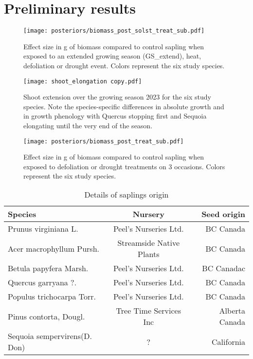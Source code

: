 \documentclass{article}
\begin{document}
	
	\section*{Preliminary results}
	
	
	\begin{figure}
	\centering
	\texttt{[image: posteriors/biomass\_post\_solst\_treat\_sub.pdf]} 
	\caption{Effect size in g of biomass compared to control sapling when exposed to an extended growing season (GS\_extend), heat, defoliation or drought event. Colors represent the six study species. }
	\label{fig:fig_1xxx}
\end{figure}
	
	
			\begin{figure}
		\centering
		\texttt{[image: shoot\_elongation copy.pdf]} 
		\caption{Shoot extension over the growing season 2023 for the six study species. Note the species-specific differences in absolute growth and in growth phenology with Quercus stopping first and Sequoia elongating until the very end of the season.}
		\label{fig:fig_1xxx}
	\end{figure}
	
	
				\begin{figure}
		\centering
		\texttt{[image: posteriors/biomass\_post\_treat\_sub.pdf]} 
		\caption{Effect size in g of biomass compared to control sapling when exposed to defoliation or drought treatments on 3 occasions. Colors represent the six study species.}
		\label{fig:fig_1xxx}
	\end{figure}
	
	
	
	
	\begin{table}[h!]
		\begin{center}
			\caption{Details of saplings origin }
			\label{tab:table1}
			\begin{tabular}{l|c|r} %
				\textbf{Species} & \textbf{Nursery} & \textbf{Seed origin}\\
				\hline
				Prunus virginiana L. & Peel's Nurseries Ltd. & BC Canada\\
				Acer macrophyllum Pursh. & Streamside Native Plants & BC Canada\\
				Betula papyfera Marsh. & Peel's Nurseries Ltd. &BC Canadac\\
				Quercus garryana ?.& Peel's Nurseries Ltd. & BC Canada\\
				Populus trichocarpa Torr. & Peel's Nurseries Ltd.& BC Canada\\
				Pinus contorta, Dougl. & Tree Time Services Inc & Alberta Canada\\
				Sequoia sempervirens(D. Don)&? & California\\
				
			\end{tabular}
		\end{center}
	\end{table}
	
\end{document}
